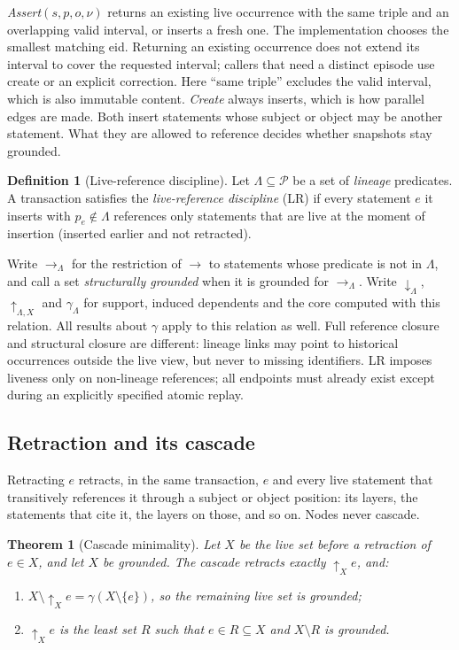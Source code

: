 \documentclass[11pt]{article}
\theoremstyle{plain}
\newtheorem{theorem}{Theorem}
\theoremstyle{definition}
\newtheorem{definition}{Definition}
\theoremstyle{remark}
\newcommand{\Pred}{\mathcal{P}}          %
\newcommand{\refs}{\rightarrow}          %
\newcommand{\supp}{{\downarrow}}          %
\newcommand{\dep}{{\uparrow}}            %
\newcommand{\core}{\gamma}               %
\newcommand{\valid}{\nu}                 %
\newcommand{\Lin}{\Lambda}               %
\begin{document}
\emph{Assert}$(s,p,o,\valid)$ returns an existing live occurrence with the
same triple and an overlapping valid interval, or inserts a fresh one.
The implementation chooses the smallest matching eid. Returning an existing
occurrence does not extend its interval to cover the requested interval; callers
that need a distinct episode use create or an explicit correction. Here
``same triple'' excludes the valid interval, which is also immutable content. \emph{Create} always inserts, which is
how parallel edges are made. Both insert statements whose subject or object may
be another statement. What they are allowed to reference decides whether
snapshots stay grounded.

\begin{definition}[Live-reference discipline]
Let $\Lin\subseteq\Pred$ be a set of \emph{lineage} predicates. A transaction
satisfies the \emph{live-reference discipline} (LR) if every statement $e$ it
inserts with $p_e\notin\Lin$ references only statements that are live at the
moment of insertion (inserted earlier and not retracted).
\end{definition}

Write $\refs_{\Lin}$ for the restriction of $\refs$ to statements whose
predicate is not in $\Lin$, and call a set \emph{structurally grounded} when it is
grounded for $\refs_{\Lin}$. Write $\supp_{\Lin}$, $\dep_{\Lin,X}$ and
$\core_{\Lin}$ for support, induced dependents and the core computed with this
relation. All results about $\core$ apply to this relation as well. Full
reference closure and structural closure are different: lineage links may point
to historical occurrences outside the live view, but never to missing identifiers.
LR imposes liveness only on non-lineage references; all endpoints must already
exist except during an explicitly specified atomic replay.

\subsection{Retraction and its cascade}

Retracting $e$ retracts, in the same transaction, $e$ and every live statement
that transitively references it through a subject or object position: its
layers, the statements that cite it, the layers on those, and so on. Nodes
never cascade.

\begin{theorem}[Cascade minimality]\label{thm:cascade}
Let $X$ be the live set before a retraction of $e\in X$, and let $X$ be
grounded. The cascade retracts exactly $\dep_X e$, and:
\begin{enumerate}
\item $X\setminus\dep_X e=\core(X\setminus\{e\})$, so the remaining live set is grounded;
\item $\dep_X e$ is the \emph{least} set $R$ such that $e\in R\subseteq X$ and $X\setminus R$ is grounded.
\end{enumerate}
\end{theorem}
\end{document}
